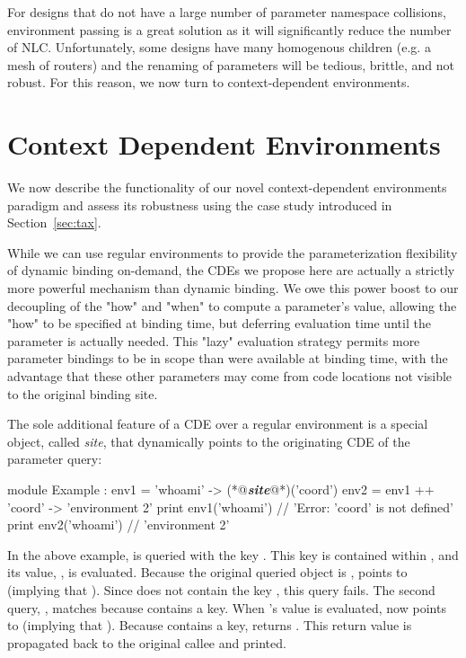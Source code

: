 For designs that do not have a large number of parameter namespace collisions, environment passing is a great solution as it will significantly reduce the number of NLC. 
Unfortunately, some designs have many homogenous children (e.g. a mesh of routers) and the renaming of parameters will be tedious, brittle, and not robust. 
For this reason, we now turn to context-dependent environments.

\section{Context Dependent Environments}
\label{sec:cde}

We now describe the functionality of our novel context-dependent environments paradigm and assess its robustness using the case study introduced in Section~\ref{sec:tax}.

While we can use regular environments to provide the parameterization flexibility of dynamic binding on-demand, 
the CDEs we propose here are actually a strictly more powerful mechanism than dynamic binding. 
We owe this power boost to our decoupling of the "how" and "when" to compute a parameter's value,
allowing the "how" to be specified at binding time,
but deferring evaluation time until the parameter is actually needed.
This "lazy" evaluation strategy permits more parameter bindings to be in scope
than were available at binding time, with the advantage that these
other parameters may come from code locations not visible to the original binding site.

The sole additional feature of a CDE over a regular environment is a special object, called \emph{site}, that dynamically points to the originating CDE of the parameter query:

\begin{phdl}
module Example :
  env1 = {'whoami' -> (*@\textcolor[rgb]{1,0.5,0}{\textbf{\textit{site}}}@*)('coord')}
  env2 = env1 ++ {'coord' -> 'environment 2'}
  print env1('whoami')     // 'Error: 'coord' is not defined'
  print env2('whoami')     // 'environment 2'
\end{phdl}

In the above example,  is queried with the key . 
This key is contained within , and its value, , is evaluated. 
Because the original queried object is ,  points to  (implying that ). 
Since  does not contain the key , this query fails.
The second query, , matches because  contains a  key. 
When 's value is evaluated,  now points to  (implying that ). 
Because  contains a  key,  returns . 
This return value is propagated back to the original  callee and printed.

